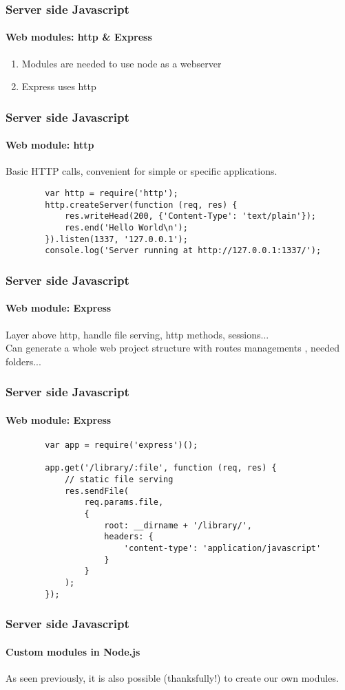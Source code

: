 \documentclass{beamer}
\begin{document}
	\begin{frame}
		\frametitle{Server side Javascript}
		\framesubtitle{Web modules: http \& Express}
		\begin{enumerate}
			\item Modules are needed to use node as a webserver
			\item Express uses http
		\end{enumerate}
	\end{frame}

	\begin{frame}[fragile]
		\frametitle{Server side Javascript}
		\framesubtitle{Web module: http}

		Basic HTTP calls, convenient for simple or specific applications.
		\begin{verbatim}
		var http = require('http');
		http.createServer(function (req, res) {
		    res.writeHead(200, {'Content-Type': 'text/plain'});
		    res.end('Hello World\n');
		}).listen(1337, '127.0.0.1');
		console.log('Server running at http://127.0.0.1:1337/');
		\end{verbatim}
	\end{frame}

	\begin{frame}
		\frametitle{Server side Javascript}
		\framesubtitle{Web module: Express}

		Layer above http, handle file serving, http methods, sessions... \\
		Can generate a whole web project structure with routes managements ,
		needed folders...
	\end{frame}

	\begin{frame}[fragile]
		\frametitle{Server side Javascript}
		\framesubtitle{Web module: Express}

		\begin{verbatim}
		var app = require('express')();

		app.get('/library/:file', function (req, res) {
		    // static file serving
		    res.sendFile(
		        req.params.file,
		        {
		            root: __dirname + '/library/',
		            headers: {
		                'content-type': 'application/javascript'
		            }
		        }
		    );
		});
		\end{verbatim}
	\end{frame}

	\begin{frame}
		\frametitle{Server side Javascript}
		\framesubtitle{Custom modules in Node.js}

		As seen previously, it is also possible (thanksfully!) to create our own
		modules.
	\end{frame}
\end{document}
